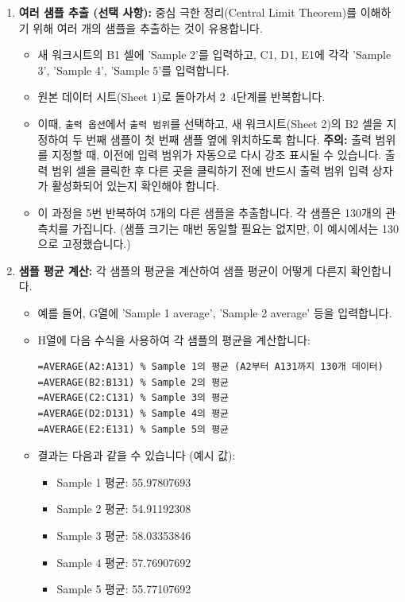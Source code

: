 \documentclass[11pt,a4paper]{book}
\newcommand{\excel}[1]{\texttt{#1}}
\theoremstyle{definition}
\begin{document}
\begin{enumerate}
    \item \textbf{여러 샘플 추출 (선택 사항):}
    중심 극한 정리(Central Limit Theorem)를 이해하기 위해 여러 개의 샘플을 추출하는 것이 유용합니다.
    \begin{itemize}
        \item 새 워크시트의 B1 셀에 'Sample 2'를 입력하고, C1, D1, E1에 각각 'Sample 3', 'Sample 4', 'Sample 5'를 입력합니다.
        \item 원본 데이터 시트(Sheet 1)로 돌아가서 2~4단계를 반복합니다.
        \item 이때, \excel{출력 옵션}에서 \excel{출력 범위}를 선택하고, 새 워크시트(Sheet 2)의 B2 셀을 지정하여 두 번째 샘플이 첫 번째 샘플 옆에 위치하도록 합니다. \textbf{주의:} 출력 범위를 지정할 때, 이전에 입력 범위가 자동으로 다시 강조 표시될 수 있습니다. 출력 범위 셀을 클릭한 후 다른 곳을 클릭하기 전에 반드시 출력 범위 입력 상자가 활성화되어 있는지 확인해야 합니다.
        \item 이 과정을 5번 반복하여 5개의 다른 샘플을 추출합니다. 각 샘플은 130개의 관측치를 가집니다. (샘플 크기는 매번 동일할 필요는 없지만, 이 예시에서는 130으로 고정했습니다.)
    \end{itemize}

    \item \textbf{샘플 평균 계산:}
    각 샘플의 평균을 계산하여 샘플 평균이 어떻게 다른지 확인합니다.
    \begin{itemize}
        \item 예를 들어, G열에 'Sample 1 average', 'Sample 2 average' 등을 입력합니다.
        \item H열에 다음 수식을 사용하여 각 샘플의 평균을 계산합니다:
        \begin{lstlisting}[language=Excel, caption={샘플 평균 계산 예시}, label={lst:sample_avg}]
=AVERAGE(A2:A131) % Sample 1의 평균 (A2부터 A131까지 130개 데이터)
=AVERAGE(B2:B131) % Sample 2의 평균
=AVERAGE(C2:C131) % Sample 3의 평균
=AVERAGE(D2:D131) % Sample 4의 평균
=AVERAGE(E2:E131) % Sample 5의 평균
        \end{lstlisting}
        \item 결과는 다음과 같을 수 있습니다 (예시 값):
        \begin{itemize}
            \item Sample 1 평균: 55.97807693
            \item Sample 2 평균: 54.91192308
            \item Sample 3 평균: 58.03353846
            \item Sample 4 평균: 57.76907692
            \item Sample 5 평균: 55.77107692
        \end{itemize}
    \end{itemize}
\end{enumerate}
\end{document}
